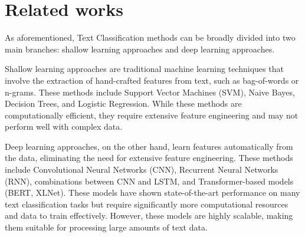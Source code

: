 \section{Related works}
As aforementioned, Text Classification methods can be broadly divided into two main branches: shallow learning approaches and deep learning approaches.

Shallow learning approaches are traditional machine learning techniques that involve the extraction of hand-crafted features from text, such as bag-of-words or n-grams. These methods include Support Vector Machines (SVM)\cite{cortesvapnik1995, boser1992}, Naive Bayes\cite{Xu2017}, Decision Trees\cite{Safavian1991}, and Logistic Regression\cite{Genkin2007, Krishnapuram2005}. While these methods are computationally efficient, they require extensive feature engineering and may not perform well with complex data.

Deep learning approaches, on the other hand, learn features automatically from the data, eliminating the need for extensive feature engineering. These methods include Convolutional Neural Networks (CNN)\cite{Kim2014}, Recurrent Neural Networks (RNN)\cite{Cho2014, Sutskever2014}, combinations between CNN and LSTM\cite{Vo2017}, and Transformer-based models (BERT\cite{DevlinCLT19}, XLNet\cite{Yang2019}). These models have shown state-of-the-art performance on many text classification tasks but require significantly more computational resources and data to train effectively. However, these models are highly scalable, making them suitable for processing large amounts of text data.